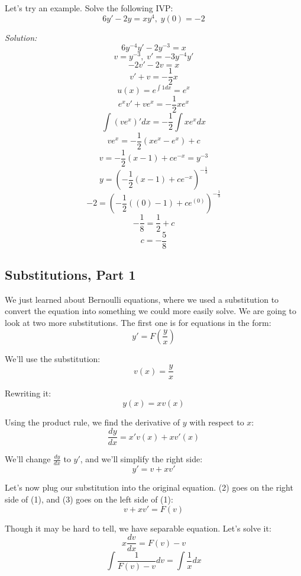 	Let's try an example. Solve the following IVP:
	$$6y' - 2y = xy^{4},\;y(0) = -2$$
	
	\textit{Solution:}
	$$6y^{-4}y' - 2y^{-3} = x$$
	$$v = y^{-3},\;v' = -3y^{-4}y'$$
	$$-2v' - 2v = x$$
	$$v' + v = -\frac{1}{2}x$$
	$$u(x) = e^{\int 1dx} = e^{x}$$
	$$e^{x}v' + ve^{x} = -\frac{1}{2}xe^{x}$$
	$$\int (ve^{x})'dx = -\frac{1}{2}\int xe^{x}dx$$
	$$ve^{x} = -\frac{1}{2}(xe^{x} - e^{x}) + c$$
	$$v = -\frac{1}{2}(x - 1) + ce^{-x} = y^{-3}$$
	$$y = \left(-\frac{1}{2}(x - 1) + ce^{-x}\right)^{-\frac{1}{3}}$$
	$$-2 = \left(-\frac{1}{2}((0) - 1) + ce^{(0)}\right)^{-\frac{1}{3}}$$
	$$-\frac{1}{8} = \frac{1}{2} + c$$
	$$c = -\frac{5}{8}$$
	\begin{center}
	\end{center}
	
	\subsection{Substitutions, Part 1}
	We just learned about Bernoulli equations, where we used a substitution to convert the equation into something we could more easily solve. We are going to look at two more substitutions. The first one is for equations in the form:
	\begin{equation}
		y' = F\left(\frac{y}{x}\right)
	\end{equation}
	
	We'll use the substitution:
	\begin{equation}
		v(x) = \frac{y}{x}
	\end{equation}
	
	Rewriting it:
	$$y(x) = xv(x)$$
	
	Using the product rule, we find the derivative of $y$ with respect to $x$:
	$$\frac{dy}{dx} = x'v(x) + xv'(x)$$
	
	We'll change $\frac{dy}{dx}$ to $y'$, and we'll simplify the right side:
	\begin{equation}
		y' = v + xv'
	\end{equation}
	
	Let's now plug our substitution into the original equation. (2) goes on the right side of (1), and (3) goes on the left side of (1):
	$$v + xv' = F(v)$$
	
	Though it may be hard to tell, we have separable equation. Let's solve it:
	$$x\frac{dv}{dx} = F(v) - v$$
	$$\int \frac{1}{F(v) - v}dv = \int \frac{1}{x}dx$$
	
